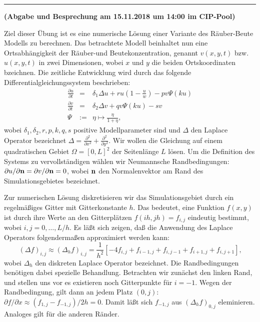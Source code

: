 \documentclass{exam}
\begin{document}
\vspace*{-0.5cm}\hrule
\begin{center} 
{\bfseries \sf(Abgabe und Besprechung am 15.11.2018 um 14:00 im CIP-Pool)}\\[.3cm]
\end{center}

Ziel dieser Übung ist es eine numerische Lösung einer Variante des Räuber-Beute Modells zu berechnen.
Das betrachtete Modell beinhaltet nun eine Ortsabhängigkeit der Räuber-und
Beutekonzentration, genannt  $v(x, y, t)$ bzw. $u(x, y, t)$ in zwei Dimensionen, wobei $x$ und $y$ die beiden Ortskoordinaten
bzeichnen. Die zeitliche Entwicklung wird durch das folgende
Differentialgleichungssystem beschrieben:
\begin{eqnarray}
\label{eqn:rb}
\frac{\partial u}{\partial t} &=& \delta_1 \Delta u + r u \left(1 - \frac{u}{w} \right) - p v \Psi(k u) \\
\frac{\partial v}{\partial t} &=& \delta_2 \Delta v + q v \Psi(k u) - s v \nonumber \\
\Psi &:=& \eta \mapsto \tfrac{\eta}{1+\eta} \nonumber\text{,}
\end{eqnarray}
wobei $\delta_1, \delta_2, r, p, k, q, s$ positive Modellparameter sind und 
$\Delta$ den Laplace Operator bezeichnet $\Delta = 
\frac{\partial^2}{\partial x^2} + \frac{\partial^2}{\partial y^2}$. Wir wollen 
die Gleichung auf einem quadratischen Gebiet $\Omega = [0, L]^2$ der Seitenlänge 
$L$ lösen. Um die Definition des Systems zu vervollständigen wählen wir 
Neumannsche Randbedingungen: $\partial u/\partial {\bf n} = \partial v/\partial 
{\bf n} = 0$, wobei ${\bf n}$ den Normalenvektor am Rand des Simulationsgebietes 
bezeichnet.

Zur numerischen Lösung diskretisieren wir das Simulationsgebiet durch ein regelmäßiges Gitter mit
Gitterkonstante $h$. Das bedeutet, eine Funktion $f(x, y)$ ist durch ihre Werte an den Gitterplätzen
$f(i h, j h) = f_{i,j}$ eindeutig bestimmt, wobei $i,j = 0,\dots,L/h$. Es läßt sich zeigen, daß die
Anwendung des Laplace Operators folgendermaßen approximiert werden kann:
\begin{equation}
\label{eqn:dlaplacian}
(\Delta f)_{i,j} \approx (\Delta_h f)_{i,j} = \frac{1}{h^2} [ -4 f_{i,j} + f_{i-1,j} + f_{i,j-1} + f_{i+1,j} + f_{i,j+1} ]\text{,}
\end{equation}
wobei $\Delta_h$ den diskreten Laplace Operator bezeichnet.
Die Randbedingungen benötigen dabei spezielle Behandlung. Betrachten wir zunächst den linken Rand, und
stellen uns vor es existieren noch Gitterpunkte für $i = -1$. Wegen der Randbedingung, gilt dann an
jedem Platz $(0,j)$: $\partial f/\partial x \approx (f_{1,j} - f_{-1,j})/2h = 0$. Damit läßt sich $f_{-1,j}$
aus $(\Delta_h f)_{0,j}$ eleminieren. Analoges gilt für die anderen Ränder.
\end{document}
